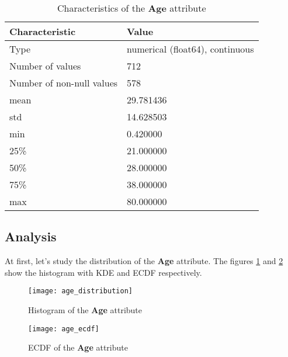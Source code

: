 \begin{table}[!hp]
    \centering
    \caption{Characteristics of the \textbf{Age} attribute}
    \begin{tabular}{|l|l|}
        \hline
        \textbf{Characteristic}   & \textbf{Value}                  \\ \hline
        Type                      & numerical (float64), continuous \\ \hline
        Number of values          & 712                             \\ \hline
        Number of non-null values & 578                             \\ \hline
        mean                      & 29.781436                       \\ \hline
        std                       & 14.628503                       \\ \hline
        min                       & 0.420000                        \\ \hline
        25\%                      & 21.000000                       \\ \hline
        50\%                      & 28.000000                       \\ \hline
        75\%                      & 38.000000                       \\ \hline
        max                       & 80.000000                       \\ \hline
    \end{tabular}
    \label{table:age_characteristics}
\end{table}

\subsection{Analysis}
At first, let's study the distribution of the \textbf{Age} attribute.
The figures \ref{pic:age_distribution} and \ref{pic:age_ecdf} show the 
histogram with KDE and ECDF respectively.

\begin{figure}[!hp]
    \centering
    \texttt{[image: age\_distribution]}
    \caption{Histogram of the \textbf{Age} attribute}
    \label{pic:age_distribution}
\end{figure}

\begin{figure}[!hp]
    \centering
    \texttt{[image: age\_ecdf]}
    \caption{ECDF of the \textbf{Age} attribute}
    \label{pic:age_ecdf}
\end{figure}

